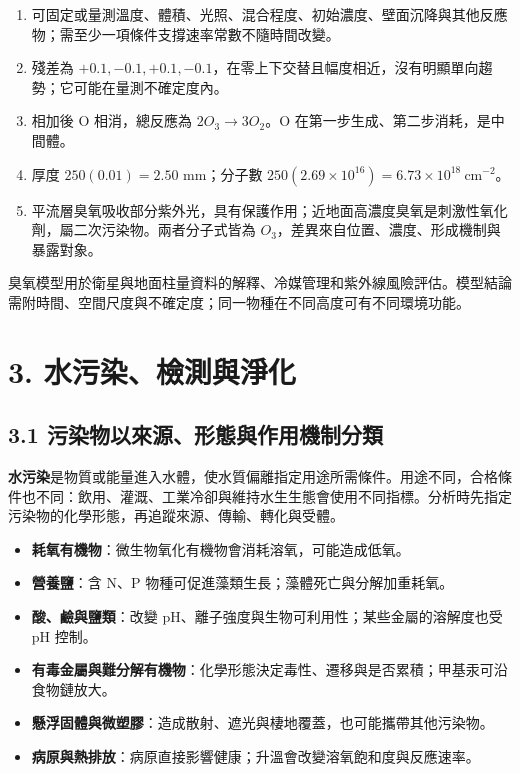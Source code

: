 \documentclass[11pt,a4paper]{article}
\providecommand{\tightlist}{%
  \setlength{\itemsep}{0pt}\setlength{\parskip}{0pt}}
\begin{document}
\begin{enumerate}
\def\labelenumi{\arabic{enumi}.}
\tightlist
\item
  可固定或量測溫度、體積、光照、混合程度、初始濃度、壁面沉降與其他反應物；需至少一項條件支撐速率常數不隨時間改變。
\item
  殘差為 \(+0.1,-0.1,+0.1,-0.1\)，在零上下交替且幅度相近，沒有明顯單向趨勢；它可能在量測不確定度內。
\item
  相加後 O 相消，總反應為 \(2O_3\rightarrow3O_2\)。O 在第一步生成、第二步消耗，是中間體。
\item
  厚度 \(250(0.01)=2.50\) mm；分子數 \(250(2.69\times10^{16})=6.73\times10^{18}\ \mathrm{cm^{-2}}\)。
\item
  平流層臭氧吸收部分紫外光，具有保護作用；近地面高濃度臭氧是刺激性氧化劑，屬二次污染物。兩者分子式皆為 \(O_3\)，差異來自位置、濃度、形成機制與暴露對象。
\end{enumerate}

臭氧模型用於衛星與地面柱量資料的解釋、冷媒管理和紫外線風險評估。模型結論需附時間、空間尺度與不確定度；同一物種在不同高度可有不同環境功能。

\section{3. 水污染、檢測與淨化}\label{ux6c34ux6c61ux67d3ux6aa2ux6e2cux8207ux6de8ux5316}

\subsection{3.1 污染物以來源、形態與作用機制分類}\label{ux6c61ux67d3ux7269ux4ee5ux4f86ux6e90ux5f62ux614bux8207ux4f5cux7528ux6a5fux5236ux5206ux985e}

\textbf{水污染}是物質或能量進入水體，使水質偏離指定用途所需條件。用途不同，合格條件也不同：飲用、灌溉、工業冷卻與維持水生生態會使用不同指標。分析時先指定污染物的化學形態，再追蹤來源、傳輸、轉化與受體。

\begin{itemize}
\tightlist
\item
  \textbf{耗氧有機物}：微生物氧化有機物會消耗溶氧，可能造成低氧。
\item
  \textbf{營養鹽}：含 N、P 物種可促進藻類生長；藻體死亡與分解加重耗氧。
\item
  \textbf{酸、鹼與鹽類}：改變 pH、離子強度與生物可利用性；某些金屬的溶解度也受 pH 控制。
\item
  \textbf{有毒金屬與難分解有機物}：化學形態決定毒性、遷移與是否累積；甲基汞可沿食物鏈放大。
\item
  \textbf{懸浮固體與微塑膠}：造成散射、遮光與棲地覆蓋，也可能攜帶其他污染物。
\item
  \textbf{病原與熱排放}：病原直接影響健康；升溫會改變溶氧飽和度與反應速率。
\end{itemize}
\end{document}
